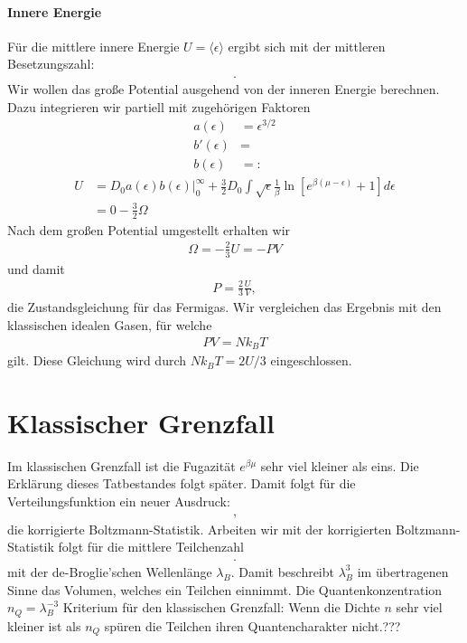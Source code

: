 \paragraph*{Innere Energie} Für die mittlere innere Energie $U=\langle\epsilon\rangle$ ergibt sich mit der mittleren Besetzungszahl:
\begin{align*}
    .
\end{align*}
Wir wollen das große Potential ausgehend von der inneren Energie berechnen.
Dazu integrieren wir partiell mit zugehörigen Faktoren 
\begin{align*}
   a(\epsilon)&=\epsilon^{3/2}\\
   b'(\epsilon)&= \\
   b(\epsilon)&=:
\end{align*}
\begin{align*}
    U&=D_0 a(\epsilon)b(\epsilon)|_0^\infty+\frac{3}{2}D_0\int\sqrt{\epsilon}\frac{1}{\beta}\ln\left[e^{\beta(\mu-\epsilon)}+1\right]d\epsilon\\
    &=0-\frac{3}{2}\Omega
\end{align*}
Nach dem großen Potential umgestellt erhalten wir 
\begin{align*}
    \Omega=-\frac{2}{3}U=-PV
\end{align*}
und damit 
\begin{align*}
    P=\frac{2}{3}\frac{U}{V},
\end{align*}
die Zustandsgleichung für das Fermigas.
Wir vergleichen das Ergebnis mit den klassischen idealen Gasen, für welche 
\begin{align*}
    PV=N k_B T
\end{align*}
gilt. Diese Gleichung wird durch $N k_B T=2U/3$ eingeschlossen.
\section{Klassischer Grenzfall}
Im klassischen Grenzfall ist die Fugazität $e^{\beta \mu}$ sehr viel kleiner als eins. Die Erklärung dieses Tatbestandes folgt später. Damit folgt für die Verteilungsfunktion ein neuer Ausdruck:
\begin{align*}
    ,
\end{align*}
die korrigierte Boltzmann-Statistik. Arbeiten wir mit der korrigierten Boltzmann-Statistik folgt für die mittlere Teilchenzahl
\begin{align*}
    .
\end{align*}
mit der de-Broglie'schen Wellenlänge $\lambda_B$. Damit beschreibt $\lambda_B^3$ im übertragenen Sinne das Volumen, welches ein Teilchen einnimmt.
Die Quantenkonzentration $n_Q=\lambda_B^{-3}$
Kriterium für den klassischen Grenzfall: Wenn die Dichte $n$ sehr viel kleiner ist als $n_Q$ spüren die Teilchen ihren Quantencharakter nicht.???
